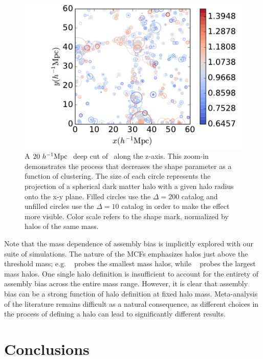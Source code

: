 \documentclass[usenatbib,usegraphicx,letterpaper]{mn2e}
\begin{document}
\begin{figure}
	\centering
	\includegraphics[width=.9\textwidth]{plotcircles.pdf}
	\caption{A $20 \ h^{-1}\mathrm{Mpc}~$ deep cut of \simB \ along the z-axis. This zoom-in demonstrates the process that decreases the shape parameter as a function of clustering. The size of each circle represents the projection of a spherical dark matter halo with a given halo radius onto the x-y plane. Filled circles use the $\Delta = 200$ catalog and unfilled circles use the $\Delta = 10$ catalog in order to make the effect more visible. Color scale refers to the shape mark, normalized by halos of the same mass.}
	\label{fig:plotcircles}
\end{figure}

Note that the mass dependence of assembly bias is implicitly explored with our suite of simulations.
The nature of the MCFs emphasizes halos just above the threshold mass; e.g. \simA~ probes the smallest mass
halos, while \simB~ probes the largest mass halos. One single halo definition is insufficient to account for the
entirety of assembly bias across the entire mass range. However, it is clear that assembly bias can be a strong
function of halo definition at fixed halo mass. Meta-analysis of the literature remains difficult as a natural
consequence, as different choices in the process of defining a halo can lead to significantly different results.


\section[]{Conclusions}
\label{section:conclusions}
\end{document}
